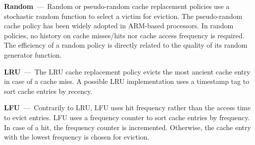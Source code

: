 \textbf{Random}~---~Random or pseudo-random cache replacement policies use a stochastic random function to select a victim for eviction.
The pseudo-random cache policy has been widely adopted in ARM-based processors.
In random policies, no history on cache misses/hits nor cache access frequency is required.
The efficiency of a random policy is directly related to the quality of its random generator function.

\textbf{LRU}~---~The LRU cache replacement policy evicts the most ancient cache entry in case of a cache miss.
A possible LRU implementation uses a timestamp tag to sort cache entries by recency.%


\textbf{LFU}~---~Contrarily to LRU, LFU uses hit frequency rather than the access time to evict entries.
LFU uses a frequency counter to sort cache entries by frequency.
In case of a hit, the frequency counter is incremented.
Otherwise, the cache entry with the lowest frequency is chosen for eviction.%
%


